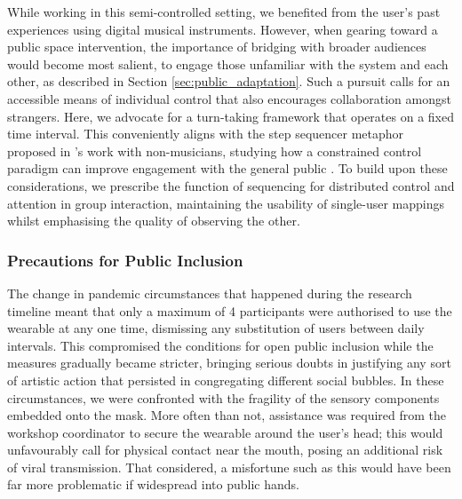 While working in this semi-controlled setting, we benefited from the user's past experiences using digital musical instruments. However, when gearing toward a public space intervention, the importance of bridging with broader audiences would become most salient, to engage those unfamiliar with the system and each other, as described in Section \ref{sec:public_adaptation}. Such a pursuit calls for an accessible means of individual control that also encourages collaboration amongst strangers. Here, we advocate for a turn-taking framework that operates on a fixed time interval. This conveniently aligns with the step sequencer metaphor proposed in \citeauthor{bengler_designing_2013}'s work with non-musicians, studying how a constrained control paradigm can improve engagement with the general public \cite{bengler_designing_2013}. To build upon these considerations, we prescribe the function of sequencing for distributed control and attention in group interaction, maintaining the usability of single-user mappings whilst emphasising the quality of observing the other.

\subsubsection{Precautions for Public Inclusion}

The change in pandemic circumstances that happened during the research timeline meant that only a maximum of 4 participants were authorised to use the wearable at any one time, dismissing any substitution of users between daily intervals. This compromised the conditions for open public inclusion while the measures gradually became stricter, bringing serious doubts in justifying any sort of artistic action that persisted in congregating different social bubbles. In these circumstances, we were confronted with the fragility of the sensory components embedded onto the mask. More often than not, assistance was required from the workshop coordinator to secure the wearable around the user's head; this would unfavourably call for physical contact near the mouth, posing an additional risk of viral transmission. That considered, a misfortune such as this would have been far more problematic if widespread into public hands.

